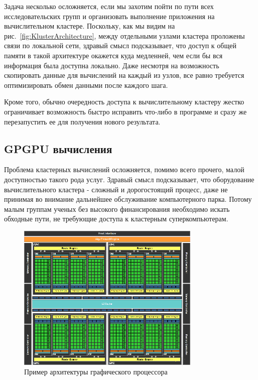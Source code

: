         Задача несколько осложняется, если мы захотим пойти по пути всех исследовательских групп и организовать выполнение приложения на вычислительном кластере. Поскольку, как мы видим на рис.~\ref{fig:KlusterArchitecture}, между отдельными узлами кластера проложены связи по локальной сети, здравый смысл подсказывает, что доступ к общей памяти в такой архитектуре окажется куда медленней, чем если бы вся информация была доступна локально. Даже несмотря на возможность скопировать данные для вычислений на каждый из узлов, все равно требуется оптимизировать обмен данными после каждого шага.

        Кроме того, обычно очередность доступа к вычислительному кластеру жестко ограничивает возможность быстро исправить что-либо в программе и сразу же перезапустить ее для получения нового результата.

    \subsection{GPGPU вычисления} %
    \label{sub:gpgpu}
        Проблема кластерных вычислений осложняется, помимо всего прочего, малой доступностью такого рода услуг. Здравый смысл подсказывает, что оборудование вычислительного кластера - сложный и дорогостоящий процесс, даже не принимая во внимание дальнейшее обслуживание компьютерного парка. Потому малым группам ученых без высокого финансирования необходимо искать обходные пути, не требующие доступа к кластерным суперкомпьютерам.

        \begin{figure}[h]
        \centering
            \includegraphics[height=200pt]{Images/GPU-diagramm}
            \caption{Пример архитектуры графического процессора}
            \label{fig:gpuArchitecture}
        \end{figure}

